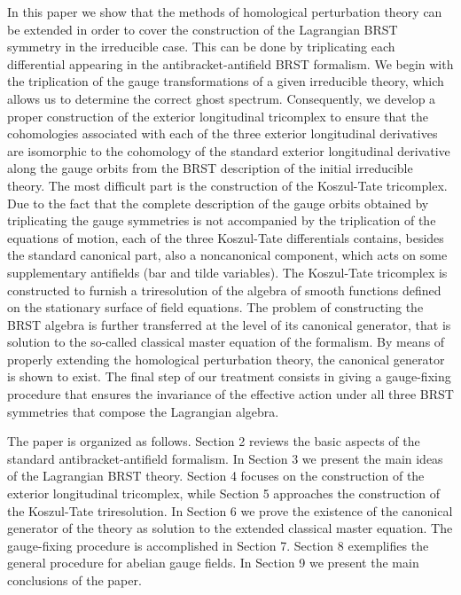 \documentclass[a4paper,12pt]{article}
\begin{document}
In this paper we show that the methods of homological perturbation theory
can be extended in order to cover the construction of the Lagrangian \coordHE{}
BRST symmetry in the irreducible case. This can be done by triplicating each
differential appearing in the antibracket-antifield BRST formalism. We begin
with the triplication of the gauge transformations of a given irreducible
theory, which allows us to determine the correct ghost spectrum.
Consequently, we develop a proper construction of the exterior longitudinal
tricomplex to ensure that the cohomologies associated with each of the three
exterior longitudinal derivatives are isomorphic to the cohomology of the
standard exterior longitudinal derivative along the gauge orbits from the
BRST description of the initial irreducible theory. The most difficult part
is the construction of the Koszul-Tate tricomplex. Due to the fact that the
complete description of the gauge orbits obtained by triplicating the gauge
symmetries is not accompanied by the triplication of the equations of
motion, each of the three Koszul-Tate differentials contains, besides the
standard canonical part, also a noncanonical component, which acts on some
supplementary antifields (bar and tilde variables). The Koszul-Tate
tricomplex is constructed to furnish a triresolution of the algebra of
smooth functions defined on the stationary surface of field equations. The
problem of constructing the \coordHE{} BRST algebra is further transferred at
the level of its canonical generator, that is solution to the so-called
classical master equation of the \coordHE{} formalism. By means of properly
extending the homological perturbation theory, the canonical generator is
shown to exist. The final step of our treatment consists in giving a
gauge-fixing procedure that ensures the invariance of the effective action
under all three BRST symmetries that compose the Lagrangian \coordHE{} algebra.

The paper is organized as follows. Section 2 reviews the basic aspects of
the standard antibracket-antifield formalism. In Section 3 we present the
main ideas of the Lagrangian BRST \coordHE{} theory. Section 4 focuses on the
construction of the exterior longitudinal tricomplex, while Section 5
approaches the construction of the Koszul-Tate triresolution. In Section 6
we prove the existence of the canonical generator of the \coordHE{} theory as
solution to the extended classical master equation. The gauge-fixing
procedure is accomplished in Section 7. Section 8 exemplifies the general
procedure for abelian gauge fields. In Section 9 we present the main
conclusions of the paper.
\end{document}
